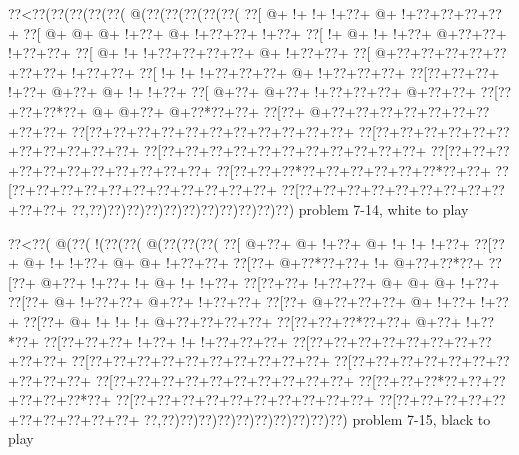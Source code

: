 \vbox{\vbox{\goo
\0??<\0??(\0??(\0??(\0??(\0??(\- @(\0??(\0??(\0??(\0??(\0??(
\0??[\- @+\- !+\- !+\- !+\0??+\- @+\- !+\0??+\0??+\0??+\0??+
\0??[\- @+\- @+\- @+\- !+\0??+\- @+\- !+\0??+\0??+\- !+\0??+
\0??[\- !+\- @+\- !+\- !+\0??+\- @+\0??+\0??+\- !+\0??+\0??+
\0??[\- @+\- !+\- !+\0??+\0??+\0??+\0??+\- @+\- !+\0??+\0??+
\0??[\- @+\0??+\0??+\0??+\0??+\0??+\0??+\0??+\- !+\0??+\0??+
\0??[\- !+\- !+\- !+\0??+\0??+\0??+\- @+\- !+\0??+\0??+\0??+
\0??[\0??+\0??+\0??+\- !+\0??+\- @+\0??+\- @+\- !+\- !+\0??+
\0??[\- @+\0??+\- @+\0??+\- !+\0??+\0??+\0??+\- @+\0??+\0??+
\0??[\0??+\0??+\0??*\0??+\- @+\- @+\0??+\- @+\0??*\0??+\0??+
\0??[\0??+\- @+\0??+\0??+\0??+\0??+\0??+\0??+\0??+\0??+\0??+
\0??[\0??+\0??+\0??+\0??+\0??+\0??+\0??+\0??+\0??+\0??+\0??+
\0??[\0??+\0??+\0??+\0??+\0??+\0??+\0??+\0??+\0??+\0??+\0??+
\0??[\0??+\0??+\0??+\0??+\0??+\0??+\0??+\0??+\0??+\0??+\0??+
\0??[\0??+\0??+\0??+\0??+\0??+\0??+\0??+\0??+\0??+\0??+\0??+
\0??[\0??+\0??+\0??*\0??+\0??+\0??+\0??+\0??+\0??*\0??+\0??+
\0??[\0??+\0??+\0??+\0??+\0??+\0??+\0??+\0??+\0??+\0??+\0??+
\0??[\0??+\0??+\0??+\0??+\0??+\0??+\0??+\0??+\0??+\0??+\0??+
\0??,\0??)\0??)\0??)\0??)\0??)\0??)\0??)\0??)\0??)\0??)\0??)
}
\hfil problem 7-14, white to play\hfil\break
}

\vbox{\vbox{\goo
\0??<\0??(\- @(\0??(\- !(\0??(\0??(\- @(\0??(\0??(\0??(
\0??[\- @+\0??+\- @+\- !+\0??+\- @+\- !+\- !+\- !+\0??+
\0??[\0??+\- @+\- !+\- !+\0??+\- @+\- @+\- !+\0??+\0??+
\0??[\0??+\- @+\0??*\0??+\0??+\- !+\- @+\0??+\0??*\0??+
\0??[\0??+\- @+\0??+\- !+\0??+\- !+\- @+\- !+\- !+\0??+
\0??[\0??+\0??+\- !+\0??+\0??+\- @+\- @+\- @+\- !+\0??+
\0??[\0??+\- @+\- !+\0??+\0??+\- @+\0??+\- !+\0??+\0??+
\0??[\0??+\- @+\0??+\0??+\0??+\- @+\- !+\0??+\- !+\0??+
\0??[\0??+\- @+\- !+\- !+\- !+\- @+\0??+\0??+\0??+\0??+
\0??[\0??+\0??+\0??*\0??+\0??+\- @+\0??+\- !+\0??*\0??+
\0??[\0??+\0??+\0??+\- !+\0??+\- !+\- !+\0??+\0??+\0??+
\0??[\0??+\0??+\0??+\0??+\0??+\0??+\0??+\0??+\0??+\0??+
\0??[\0??+\0??+\0??+\0??+\0??+\0??+\0??+\0??+\0??+\0??+
\0??[\0??+\0??+\0??+\0??+\0??+\0??+\0??+\0??+\0??+\0??+
\0??[\0??+\0??+\0??+\0??+\0??+\0??+\0??+\0??+\0??+\0??+
\0??[\0??+\0??+\0??*\0??+\0??+\0??+\0??+\0??+\0??*\0??+
\0??[\0??+\0??+\0??+\0??+\0??+\0??+\0??+\0??+\0??+\0??+
\0??[\0??+\0??+\0??+\0??+\0??+\0??+\0??+\0??+\0??+\0??+
\0??,\0??)\0??)\0??)\0??)\0??)\0??)\0??)\0??)\0??)\0??)
}
\hfil problem 7-15, black to play\hfil\break
}

